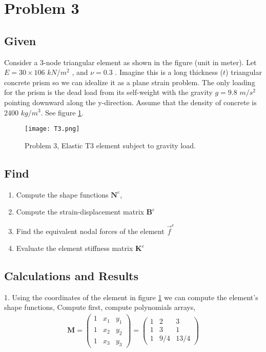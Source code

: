 \documentclass[a4paper]{memoir}
\begin{document}
\section{Problem 3}
\subsection{Given}
Consider a 3-node triangular element as shown in the figure (unit in meter). Let $E = 30\times106$ $kN/m^2$ , and $\nu = 0.3$ . Imagine this is a long thickness ($t$) triangular concrete prism so we can idealize it as a plane strain problem. The only loading for the prism is the dead load from its self-weight with the gravity $g = 9.8$ $m/s^2$ pointing downward along the y-direction. Assume that the density of concrete is 2400 $kg/m^3$. See figure \ref{fig:T3underGravity}.

\begin{figure}
	\centering
		\texttt{[image: T3.png]}
	\caption{Problem 3, Elastic T3 element subject to gravity load.}
	\label{fig:T3underGravity}
\end{figure}

\subsection{Find}
\begin{enumerate}
 \item Compute the shape functions $\textbf{N}^e$,
 \item Compute the strain-displacement matrix $\textbf{B}^e$
 \item Find the equivalent nodal forces of the element $\vec{f}^e$
 \item Evaluate the element stiffness matrix $\textbf{K}^e$
\end{enumerate}

\subsection{Calculations and Results}
1. Using the coordinates of the element in figure \ref{fig:T3underGravity} we can compute the element's shape functions,
Compute first, compute polynomials arrays,
\begin{align*}
	\textbf{M} = \left(
\begin{array}{ccc}
 1 & x_1 & y_1 \\
 1 & x_2 & y_2 \\
 1 & x_3 & y_3 
\end{array}
\right)
=
\left(
\begin{array}{ccc}
 1 & 2 & 3 \\
 1 & 3 & 1 \\
 1 & 9/4 & 13/4
\end{array}
\right)
\end{align*}
\end{document}
